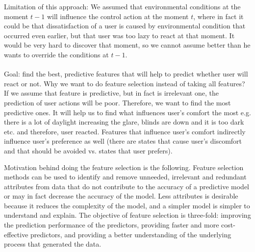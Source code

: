 \documentclass[a4paper]{article}
\begin{document}
\begin{enumerate}[I]
\color{red} Limitation of this approach: We assumed that environmental conditions at the moment $t-1$ will influence the control action at the moment $t$, where in fact it could be that dissatisfaction of a user is caused by environmental condition that occurred even earlier, but that user was too lazy to react at that moment. It would be very hard to discover that moment, so we cannot assume better than he wants to override the conditions at $t-1$. \color{black}
\\\\
Goal: find the best, predictive features that will help to predict whether user will react or not. Why we want to do feature selection instead of taking all features? If we assume that feature is predictive, but in fact is irrelevant one, the prediction of user actions will be poor. Therefore, we want to find the most predictive ones. It will help us to find what influences user's comfort the most e.g. there is a lot of daylight increasing the glare, blinds are down and it is too dark etc. and therefore, user reacted. Features that influence user's comfort indirectly influence user's preference as well (there are states that cause user's discomfort and that should be avoided vs. states that user prefers). 

 Motivation behind doing the feature selection is the following. Feature selection methods can be used to identify and remove unneeded, irrelevant and redundant attributes from data that do not contribute to the accuracy of a predictive model or may in fact decrease the accuracy of the model. Less attributes is desirable because it reduces the complexity of the model, and a simpler model is simpler to understand and explain. The objective of feature selection is three-fold: improving the prediction performance of the predictors, providing faster and more cost-effective predictors, and providing a better understanding of the underlying process that generated the data.


\end{enumerate}
\end{document}
